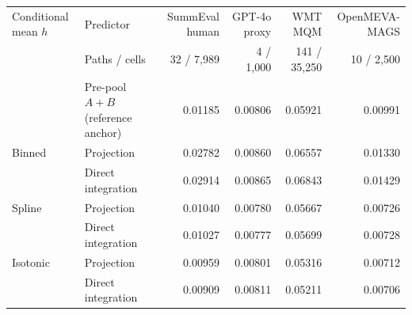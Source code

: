 \begin{tabular}{llrrrr}
\toprule
Conditional mean $h$ & Predictor & SummEval human & GPT-4o proxy & WMT MQM & OpenMEVA-MAGS \\
 & Paths / cells & 32 / 7,989 & 4 / 1,000 & 141 / 35,250 & 10 / 2,500 \\
\midrule
 & Pre-pool $A{+}B$ (reference anchor) & 0.01185 & 0.00806 & 0.05921 & 0.00991 \\
\midrule
Binned & Projection & 0.02782 & 0.00860 & 0.06557 & 0.01330 \\
 & Direct integration & 0.02914 & 0.00865 & 0.06843 & 0.01429 \\
\midrule
Spline & Projection & 0.01040 & 0.00780 & 0.05667 & 0.00726 \\
 & Direct integration & 0.01027 & 0.00777 & 0.05699 & 0.00728 \\
\midrule
Isotonic & Projection & 0.00959 & 0.00801 & 0.05316 & 0.00712 \\
 & Direct integration & 0.00909 & 0.00811 & 0.05211 & 0.00706 \\
\bottomrule
\end{tabular}
